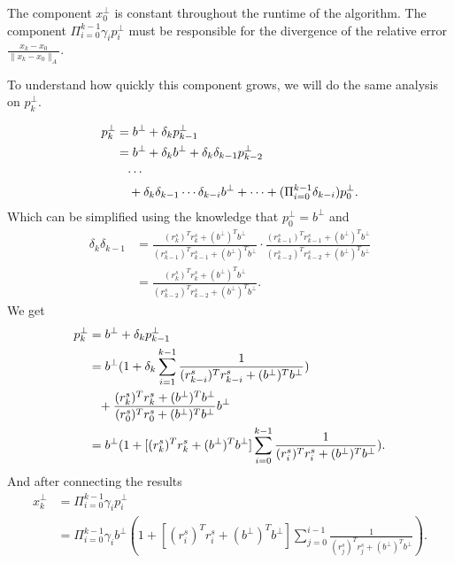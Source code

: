 The component \(x_0^\perp\) is constant throughout the runtime of the algorithm. The component \(\Pi_{i=0}^{k-1}\gamma_{i}p_{i}^\perp \) must be responsible for the divergence of the relative error \(\frac{x_k - x_0}{\|x_k - x_0\|_A}\).

To understand how quickly this component grows, we will do the same analysis on \(p_k^\perp\).

\begin{equation}
\begin{aligned}
p_k^\perp &= b^\perp + \delta_kp_{k-1}^\perp \\
&= b^\perp + \delta_kb^\perp + \delta_k\delta_{k-1}p_{k-2}^\perp \\
&\hphantom{=} \cdots \\
&\quad + \delta_k\delta_{k-1} \cdots \delta_{k-i} b^\perp + \dots + (\Pi_{i=0}^{k-1}\delta_{k-i})p_0^\perp.
\end{aligned}
\label{p_k decomp}
\end{equation}
Which can be simplified using the knowledge that \(p_0^\perp = b^\perp\) and 
\begin{equation}
\begin{aligned}
\delta_k\delta_{k-1} &= \frac{(r_k^s)^T r_k^s + (b^\perp)^T b^\perp}{(r_{k-1}^s)^T r_{k-1}^s + (b^\perp)^T b^\perp} 
\cdot \frac{(r_{k-1}^s)^T r_{k-1}^s + (b^\perp)^T b^\perp}{(r_{k-2}^s)^T r_{k-2}^s + (b^\perp)^T b^\perp} \\
&= \frac{(r_k^s)^T r_k^s + (b^\perp)^T b^\perp}{(r_{k-2}^s)^T r_{k-2}^s + (b^\perp)^T b^\perp}.
\end{aligned}
\label{delta_k_decomp}
\end{equation}
We get
\begin{equation}
\begin{aligned}
p_k^\perp &= b^\perp + \delta_kp_{k-1}^\perp \\
&= b^\perp (1 + \delta_k \sum_{i=1}^{k-1} \frac{1}{(r_{k-i}^s)^T r_{k-i}^s + (b^\perp)^T b^\perp}) \\
&\hphantom{=} + \frac{(r_k^s)^T r_k^s + (b^\perp)^T b^\perp}{(r_{0}^s)^T r_{0}^s + (b^\perp)^T b^\perp} b^\perp \\
&= b^\perp (1 + [(r_k^s)^T r_k^s + (b^\perp)^T b^\perp] \sum_{i=0}^{k-1} \frac{1}{(r_{i}^s)^T r_{i}^s + (b^\perp)^T b^\perp}).
\end{aligned}
\label{p_k_full}
\end{equation}
And after connecting the results
\begin{equation}
    \begin{aligned}
        x_k^\perp &= \Pi_{i=0}^{k-1}\gamma_{i}p_{i}^\perp\\
        &= \Pi_{i=0}^{k-1}\gamma_{i}b^\perp (1 + [(r_i^s)^T r_i^s + (b^\perp)^T b^\perp] \sum_{j=0}^{i-1} \frac{1}{(r_{j}^s)^T r_{j}^s + (b^\perp)^T b^\perp}).
    \end{aligned}
\end{equation}

